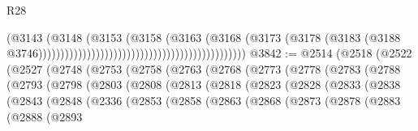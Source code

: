 \begin{lexlean}{R28}
\begin{coremodule}
                                                                              (@3143
                                                                                (@3148
                                                                                  (@3153
                                                                                    (@3158
                                                                                      (@3163
                                                                                        (@3168
                                                                                          (@3173
                                                                                            (@3178
                                                                                              (@3183
                                                                                                (@3188
                                                                                                  @3746)))))))))))))))))))))))))))))))))))))))))))))))
@3842 := @2514
    (@2518
      (@2522
        (@2527
          (@2748
            (@2753
              (@2758
                (@2763
                  (@2768
                    (@2773
                      (@2778
                        (@2783
                          (@2788
                            (@2793
                              (@2798
                                (@2803
                                  (@2808
                                    (@2813
                                      (@2818
                                        (@2823
                                          (@2828
                                            (@2833
                                              (@2838
                                                (@2843
                                                  (@2848
                                                    (@2336
                                                      (@2853
                                                        (@2858
                                                          (@2863
                                                            (@2868
                                                              (@2873
                                                                (@2878
                                                                  (@2883
                                                                    (@2888
                                                                      (@2893

\end{coremodule}
\end{lexlean}
